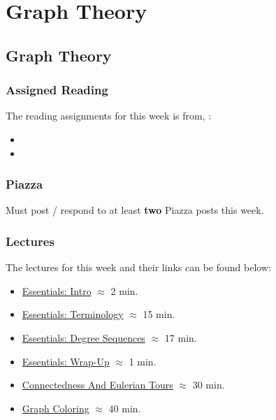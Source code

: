 \clearpage

\renewcommand{\ChapTitle}{Graph Theory}
\renewcommand{\SectionTitle}{Graph Theory}

\chapter{\ChapTitle}
\section{\SectionTitle}

\subsection{Assigned Reading}

The reading assignments for this week is from, \Textbook:

\begin{itemize}
    \item {}
    \item {}
\end{itemize}

\subsection{Piazza}

Must post / respond to at least \textbf{two} Piazza posts this week.

\subsection{Lectures}

The lectures for this week and their links can be found below:

\begin{itemize}
    \item \href{https://applied.cs.colorado.edu/mod/hvp/view.php?id=51873}{Essentials: Intro} $\approx$ 2 min.
    \item \href{https://applied.cs.colorado.edu/mod/hvp/view.php?id=51874}{Essentials: Terminology} $\approx$ 15 min.
    \item \href{https://applied.cs.colorado.edu/mod/hvp/view.php?id=51875}{Essentials: Degree Sequences} $\approx$ 17 min.
    \item \href{https://applied.cs.colorado.edu/mod/hvp/view.php?id=51876}{Essentials: Wrap-Up} $\approx$ 1 min.
    \item \href{https://applied.cs.colorado.edu/mod/hvp/view.php?id=51877}{Connectedness And Eulerian Tours} $\approx$ 30 min.
    \item \href{https://applied.cs.colorado.edu/mod/hvp/view.php?id=51878}{Graph Coloring} $\approx$ 40 min.
\end{itemize}

